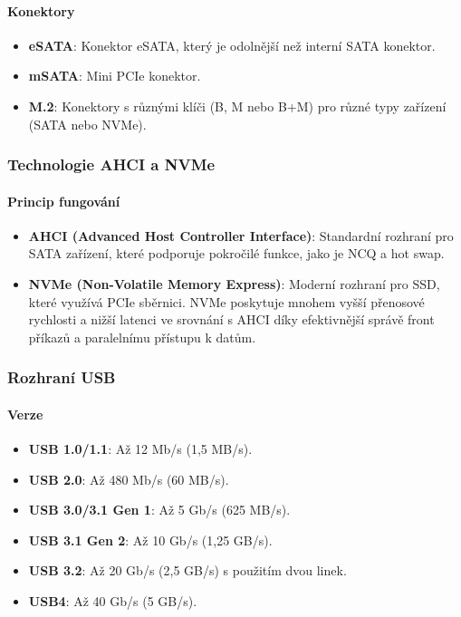 \paragraph{Konektory}
\begin{itemize}
\item \textbf{eSATA}: Konektor eSATA, který je odolnější než interní SATA konektor.
\item \textbf{mSATA}: Mini PCIe konektor.
\item \textbf{M.2}: Konektory s různými klíči (B, M nebo B+M) pro různé typy zařízení (SATA nebo NVMe).
\end{itemize}

\subsubsection{Technologie AHCI a NVMe}

\paragraph{Princip fungování}
\begin{itemize}
\item \textbf{AHCI (Advanced Host Controller Interface)}: Standardní rozhraní pro SATA zařízení, které podporuje pokročilé funkce, jako je NCQ a hot swap.
\item \textbf{NVMe (Non-Volatile Memory Express)}: Moderní rozhraní pro SSD, které využívá PCIe sběrnici. NVMe poskytuje mnohem vyšší přenosové rychlosti a nižší latenci ve srovnání s AHCI díky efektivnější správě front příkazů a paralelnímu přístupu k datům.
\end{itemize}

\subsubsection{Rozhraní USB}

\paragraph{Verze}
\begin{itemize}
\item \textbf{USB 1.0/1.1}: Až 12 Mb/s (1,5 MB/s).
\item \textbf{USB 2.0}: Až 480 Mb/s (60 MB/s).
\item \textbf{USB 3.0/3.1 Gen 1}: Až 5 Gb/s (625 MB/s).
\item \textbf{USB 3.1 Gen 2}: Až 10 Gb/s (1,25 GB/s).
\item \textbf{USB 3.2}: Až 20 Gb/s (2,5 GB/s) s použitím dvou linek.
\item \textbf{USB4}: Až 40 Gb/s (5 GB/s).
\end{itemize}

